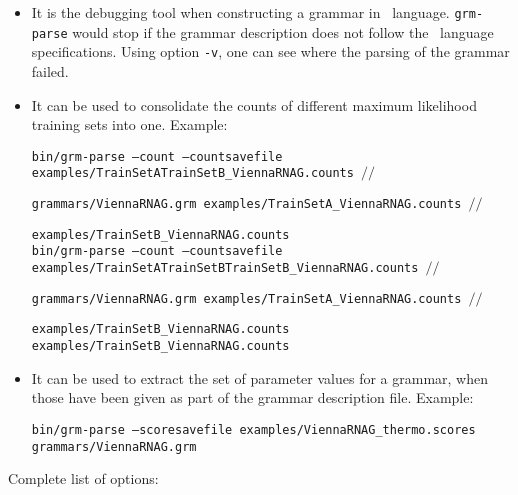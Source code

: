 \begin{itemize}

\item It is the debugging tool when constructing a grammar in
  \tornado\, language. \texttt{grm-parse} would stop if the grammar
  description does not follow the \tornado\, language specifications.
  Using option \texttt{-v}, one can see where the parsing of the
  grammar failed.


\item It can be used to consolidate the counts of different maximum
  likelihood training sets into one.  Example:\\

\begin{scriptsize}
 \texttt{bin/grm-parse --count --countsavefile examples/TrainSetATrainSetB\_ViennaRNAG.counts $//$}

 \hspace{15mm}\texttt{grammars/ViennaRNAG.grm examples/TrainSetA\_ViennaRNAG.counts  $//$}

 \hspace{15mm}\texttt{examples/TrainSetB\_ViennaRNAG.counts }\\

 \texttt{bin/grm-parse --count --countsavefile examples/TrainSetATrainSetBTrainSetB\_ViennaRNAG.counts $//$}

\hspace{15mm}\texttt{grammars/ViennaRNAG.grm examples/TrainSetA\_ViennaRNAG.counts $//$}

\hspace{15mm}\texttt{examples/TrainSetB\_ViennaRNAG.counts examples/TrainSetB\_ViennaRNAG.counts }\\
\end{scriptsize}

\item It can be used to extract the set of parameter values for a
  grammar, when those have been given as part of the grammar
  description file. Example:\\

\begin{scriptsize}
 \texttt{bin/grm-parse --scoresavefile examples/ViennaRNAG\_thermo.scores grammars/ViennaRNAG.grm}\\
\end{scriptsize}

\end{itemize}

\noindent
Complete list of options:

